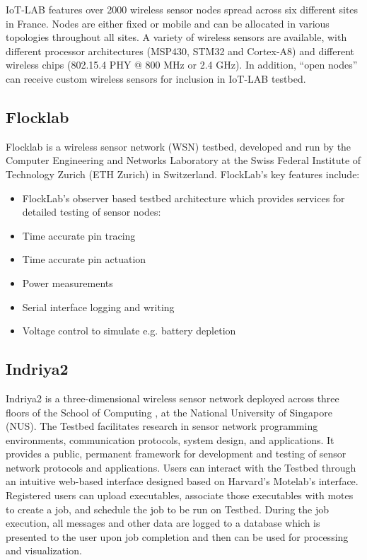 IoT-LAB features over 2000 wireless sensor nodes spread across six different sites in France.  Nodes are either fixed or mobile and can be allocated in various topologies throughout all sites.  A variety of wireless sensors are available, with different processor architectures (MSP430, STM32 and Cortex-A8) and different wireless chips (802.15.4 PHY @ 800 MHz or 2.4 GHz).  In addition, “open nodes” can receive custom wireless sensors for inclusion in IoT-LAB testbed.

\subsection{Flocklab}

Flocklab \cite{flocklab} is a wireless sensor network (WSN) testbed, developed and run by the ​Computer Engineering and Networks Laboratory at the ​Swiss Federal Institute of Technology Zurich (ETH Zurich) in Switzerland. FlockLab's key features include:
\begin{itemize}
	\item FlockLab's observer based testbed architecture which provides services for detailed testing of sensor nodes:
	\item Time accurate pin tracing
	\item Time accurate pin actuation
	\item Power measurements
	\item Serial interface logging and writing
	\item Voltage control to simulate e.g. battery depletion
\end{itemize}

\subsection{Indriya2}

Indriya2 \cite{indriya2} is a three-dimensional wireless sensor network deployed across three floors of the School of Computing , at the National University of Singapore (NUS). The Testbed facilitates research in sensor network programming environments, communication protocols, system design, and applications. It provides a public, permanent framework for development and testing of sensor network protocols and applications. Users can interact with the Testbed through an intuitive web-based interface designed based on Harvard's Motelab's interface. Registered users can upload executables, associate those executables with motes to create a job, and schedule the job to be run on Testbed. During the job execution, all messages and other data are logged to a database which is presented to the user upon job completion and then can be used for processing and visualization. 

